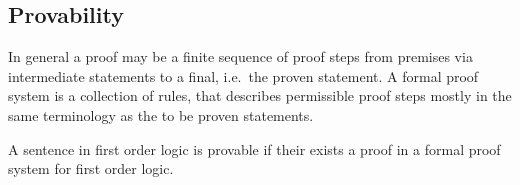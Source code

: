 
\subsection{Provability}

In general a proof may be a finite sequence of proof steps from premises via intermediate statements to a final, i.e.~the proven statement. 
A formal proof system is a collection of rules, that describes permissible proof steps  mostly in the same terminology as the to be proven statements.
\IMPROVE






\begin{definition}\IMPROVE A sentence in first order logic is provable if their exists a proof in a formal proof system for first order logic.
\end{definition}
